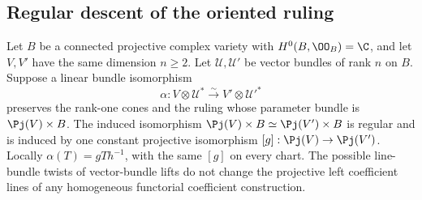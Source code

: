 \subsection{Regular descent of the oriented ruling}



\begin{lemma}
\label{lem:oriented-segre-descent}
Let \(B\) be a connected projective complex variety with
\(H^0(B,\OO_B)=\C\), and let \(V,V'\) have the same dimension
\(n\ge2\).  Let \(\mathcal U,\mathcal U'\) be vector bundles
of rank \(n\) on \(B\).  Suppose a linear bundle isomorphism
\[
 \alpha:V\otimes\mathcal U^*\xrightarrow{\sim}
                         V'\otimes\mathcal U'^*
\]
preserves the rank-one cones and the ruling whose parameter bundle
is \(\Pj(V)\times B\).  The induced isomorphism
\(\Pj(V)\times B\simeq\Pj(V')\times B\) is regular and is
induced by one constant projective isomorphism \([g]:\Pj(V)\to\Pj(V')\).
Locally \(\alpha(T)=gTh^{-1}\), with the same \([g]\) on every
chart.  The possible line-bundle twists of vector-bundle lifts do
not change the projective left coefficient lines of any homogeneous
functorial coefficient construction.
\end{lemma}
